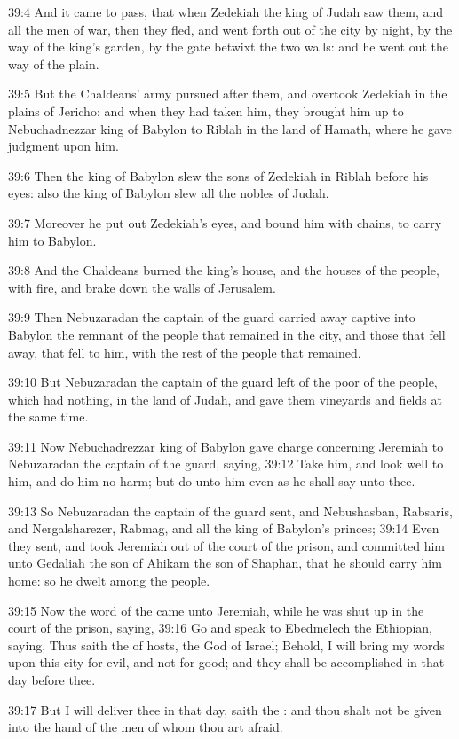 39:4 And it came to pass, that when Zedekiah the king of Judah saw them, and all the men of war, then they fled, and went forth out of the city by night, by the way of the king's garden, by the gate betwixt the two walls: and he went out the way of the plain.

39:5 But the Chaldeans' army pursued after them, and overtook Zedekiah in the plains of Jericho: and when they had taken him, they brought him up to Nebuchadnezzar king of Babylon to Riblah in the land of Hamath, where he gave judgment upon him.

39:6 Then the king of Babylon slew the sons of Zedekiah in Riblah before his eyes: also the king of Babylon slew all the nobles of Judah.

39:7 Moreover he put out Zedekiah's eyes, and bound him with chains, to carry him to Babylon.

39:8 And the Chaldeans burned the king's house, and the houses of the people, with fire, and brake down the walls of Jerusalem.

39:9 Then Nebuzaradan the captain of the guard carried away captive into Babylon the remnant of the people that remained in the city, and those that fell away, that fell to him, with the rest of the people that remained.

39:10 But Nebuzaradan the captain of the guard left of the poor of the people, which had nothing, in the land of Judah, and gave them vineyards and fields at the same time.

39:11 Now Nebuchadrezzar king of Babylon gave charge concerning Jeremiah to Nebuzaradan the captain of the guard, saying, 39:12 Take him, and look well to him, and do him no harm; but do unto him even as he shall say unto thee.

39:13 So Nebuzaradan the captain of the guard sent, and Nebushasban, Rabsaris, and Nergalsharezer, Rabmag, and all the king of Babylon's princes; 39:14 Even they sent, and took Jeremiah out of the court of the prison, and committed him unto Gedaliah the son of Ahikam the son of Shaphan, that he should carry him home: so he dwelt among the people.

39:15 Now the word of the \LORD came unto Jeremiah, while he was shut up in the court of the prison, saying, 39:16 Go and speak to Ebedmelech the Ethiopian, saying, Thus saith the \LORD of hosts, the God of Israel; Behold, I will bring my words upon this city for evil, and not for good; and they shall be accomplished in that day before thee.

39:17 But I will deliver thee in that day, saith the \LORD: and thou shalt not be given into the hand of the men of whom thou art afraid.

